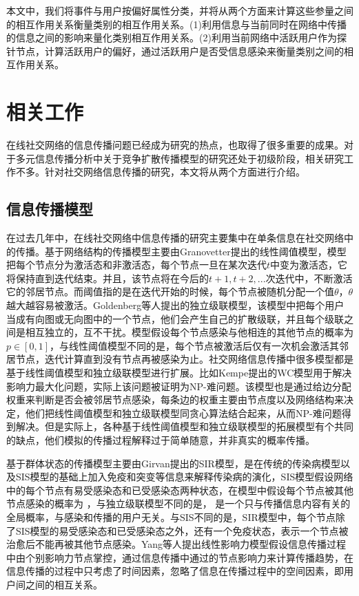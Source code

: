 本文中，我们将事件与用户按偏好属性分类，并将从两个方面来计算这些参量之间的相互作用关系衡量类别的相互作用关系。(1)利用信息与当前同时在网络中传播的信息之间的影响来量化类别相互作用关系。(2)利用当前网络中活跃用户作为探针节点，计算活跃用户的偏好，通过活跃用户是否受信息感染来衡量类别之间的相互作用关系。


\section{相关工作}
在线社交网络的信息传播问题已经成为研究的热点，也取得了很多重要的成果。对于多元信息传播分析中关于竞争扩散传播模型的研究还处于初级阶段，相关研究工作不多。针对社交网络信息传播的研究，本文将从两个方面进行介绍。

\subsection{信息传播模型}
在过去几年中，在线社交网络中信息传播的研究主要集中在单条信息在社交网络中的传播。基于网络结构的传播模型主要由Granovetter提出的线性阈值模型，模型把每个节点分为激活态和非激活态，每个节点一旦在某次迭代$t$中变为激活态，它将保持直到迭代结束。并且，该节点将在今后的$t+1,t+2,...$次迭代中，不断激活它的邻居节点。而阈值指的是在迭代开始的时候，每个节点被随机分配一个值$\theta$，$\theta$越大越容易被激活。Goldenberg等人提出的独立级联模型，该模型中把每个用户当成有向图或无向图中的一个节点，他们会产生自己的扩散级联，并且每个级联之间是相互独立的，互不干扰。模型假设每个节点感染与他相连的其他节点的概率为$p\in[0,1]$，与线性阈值模型不同的是，每个节点被激活后仅有一次机会激活其邻居节点，迭代计算直到没有节点再被感染为止。社交网络信息传播中很多模型都是基于线性阈值模型和独立级联模型进行扩展。比如Kempe提出的WC模型用于解决影响力最大化问题，实际上该问题被证明为NP-难问题。该模型也是通过给边分配权重来判断是否会被邻居节点感染，每条边的权重主要由节点度以及网络结构来决定，他们把线性阈值模型和独立级联模型同贪心算法结合起来，从而NP-难问题得到解决。但是实际上，各种基于线性阈值模型和独立级联模型的拓展模型有个共同的缺点，他们模拟的传播过程解释过于简单随意，并非真实的概率传播。

基于群体状态的传播模型主要由Girvan提出的SIR模型，是在传统的传染病模型以及SIS模型的基础上加入免疫和突变等信息来解释传染病的演化，SIS模型假设网络中的每个节点有易受感染态和已受感染态两种状态，在模型中假设每个节点被其他节点感染的概率为 ，与独立级联模型不同的是， 是一个只与传播信息内容有关的全局概率，与感染和传播的用户无关。与SIS不同的是，SIR模型中，每个节点除了SIS模型的易受感染态和已受感染态之外，还有一个免疫状态，表示一个节点被治愈后不能再被其他节点感染。Yang等人提出线性影响力模型假设信息传播过程中由个别影响力节点掌控，通过信息传播中通过的节点影响力来计算传播趋势，在信息传播的过程中只考虑了时间因素，忽略了信息在传播过程中的空间因素，即用户间之间的相互关系。


